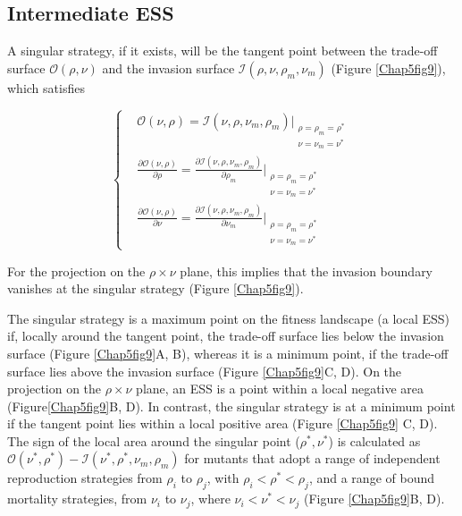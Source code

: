 \documentclass[11.5pt]{article}
\begin{document}
\subsection{Intermediate ESS}

A singular strategy, if it exists, will be the tangent point between the trade-off surface $\mathcal{O}(\rho, \nu)$ and the invasion surface $\mathcal{I}(\rho, \nu, \rho_m, \nu_m)$ (Figure \ref{Chap5fig9}), which satisfies

$$\left \{
\begin{aligned}
& 
\mathcal{O}(\nu, \rho) = 
\mathcal{I}(\nu, \rho, \nu_m, \rho_m) |_{\substack{\rho = \rho_m = \rho^* \\
             \nu = \nu_m = \nu^*}} 
             \\
& 
\frac{\partial \mathcal{O}(\nu, \rho)}{\partial \rho} = 
\frac{\partial  \mathcal{I}(\nu, \rho, \nu_m, \rho_m) }{\partial \rho_m}
\Big|_{\substack{\rho = \rho_m = \rho^* \\
                 \nu = \nu_m = \nu^*}} 
                 \\
& 
\frac{\partial \mathcal{O}(\nu, \rho) }{\partial \nu} = 
\frac{\partial  \mathcal{I}(\nu, \rho, \nu_m, \rho_m) }{\partial \nu_m} 
\Big|_{\substack{\rho = \rho_m = \rho^* \\
                 \nu = \nu_m = \nu^*}}
\end{aligned}
\right.$$

For the projection on the $\rho \times \nu$ plane, this implies that the invasion boundary vanishes at the singular strategy (Figure \ref{Chap5fig9}).

\medskip

The singular strategy is a maximum point on the fitness landscape (a local ESS) if, locally around the tangent point, the trade-off surface lies below the invasion surface (Figure \ref{Chap5fig9}A, B), whereas it is a minimum point, if the trade-off surface lies above the invasion surface (Figure \ref{Chap5fig9}C, D). On the projection on the $\rho \times \nu$ plane, an ESS is a point within a local negative area (Figure\ref{Chap5fig9}B, D). In contrast, the singular strategy is at a minimum point if the tangent point lies within a local positive area (Figure \ref{Chap5fig9} C, D). The sign of the local area around the singular point ($\rho^*, \nu^*$) is calculated as 
$\mathcal{O}(\nu^*, \rho^*) - \mathcal{I}(\nu^*, \rho^*, \nu_m, \rho_m)$ for mutants that adopt a range of independent reproduction strategies from $\rho_i$ to $\rho_j$, with $\rho_i < \rho^* < \rho_j$, and a range of bound mortality strategies, from $\nu_i$ to $\nu_j$, where $\nu_i < \nu^* < \nu_j$ (Figure \ref{Chap5fig9}B, D). 
\end{document}
